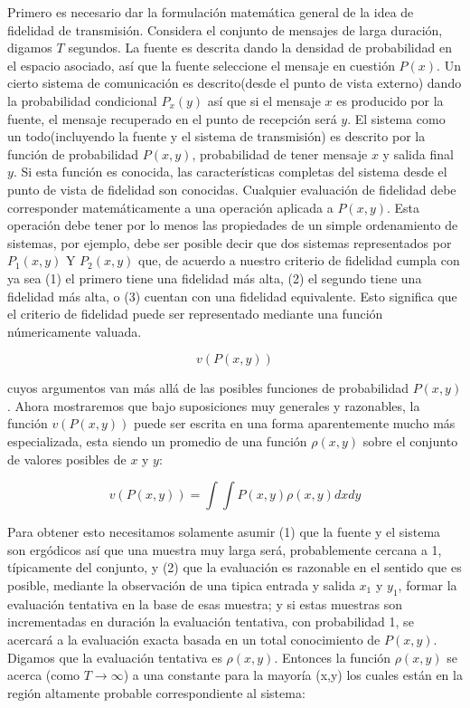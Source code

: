 Primero es necesario dar la formulaci\'on matem\'atica general de la idea de 
fidelidad de transmisi\'on. Considera el conjunto de mensajes de larga duraci\'on,
digamos $T$ segundos. La fuente es descrita dando la densidad de probabilidad
en el espacio asociado, as\'i que la fuente seleccione el mensaje en cuesti\'on
$P(x)$. Un cierto sistema de comunicaci\'on es descrito(desde el punto de vista
externo) dando la probabilidad condicional $P_{x}(y)$ as\'i que si el mensaje $x$
es producido por la fuente, el mensaje recuperado en el punto de recepci\'on
ser\'a $y$. El sistema como un todo(incluyendo la fuente y el sistema de
transmisi\'on) es descrito por la funci\'on de probabilidad $P(x, y)$, probabilidad
de tener mensaje $x$ y salida final $y$. Si esta funci\'on es conocida, 
las caracter\'isticas completas del sistema desde el punto de vista de fidelidad
son conocidas. Cualquier evaluaci\'on de fidelidad debe corresponder matem\'aticamente
a una operaci\'on aplicada a $P(x, y)$. Esta operaci\'on debe tener por lo menos las
propiedades de un simple ordenamiento de sistemas, por ejemplo, debe ser posible
decir que dos sistemas representados por $P_{1}(x, y)$ Y $P_{2}(x, y)$ que, de acuerdo
a nuestro criterio de fidelidad cumpla con ya sea (1) el primero tiene una
fidelidad m\'as alta, (2) el segundo tiene una fidelidad m\'as alta, o (3) cuentan
con una fidelidad equivalente. Esto significa que el criterio de fidelidad
puede ser representado mediante una funci\'on n\'umericamente valuada.

\begin{equation} v(P(x,y)) \end{equation}
			
cuyos argumentos van m\'as all\'a de las posibles funciones de probabilidad $P(x,y)$.
Ahora mostraremos que bajo suposiciones muy generales y razonables, la funci\'on
$v(P(x,y))$ puede ser escrita en una forma aparentemente mucho m\'as especializada,
esta siendo un promedio de una funci\'on $\rho(x,y)$ sobre el conjunto de valores posibles
de $x$ y $y$:

\begin{equation} v(P(x,y)) = \int \int P(x,y) \rho(x,y)dx dy \end{equation}
			
Para obtener esto necesitamos solamente asumir (1) que la fuente y el sistema 
son erg\'odicos as\'i que una muestra muy larga ser\'a, probablemente cercana a 1,
t\'ipicamente del conjunto, y (2) que la evaluaci\'on es razonable en el sentido 
que es posible, mediante la observaci\'on de una tipica entrada y salida $x_{1}$ y $y_{1}$, 
formar la evaluaci\'on tentativa en la base de esas muestra; y si estas muestras 
son incrementadas en duraci\'on la evaluaci\'on tentativa, con probabilidad 1,
se acercar\'a a la evaluaci\'on exacta basada en un total conocimiento de $P(x, y)$.
Digamos que la evaluaci\'on tentativa es $\rho(x, y)$. Entonces la funci\'on $\rho(x, y)$
se acerca (como $T \rightarrow \infty$) a una constante para la mayor\'ia (x,y) los cuales est\'an
en la regi\'on altamente probable correspondiente al sistema:

